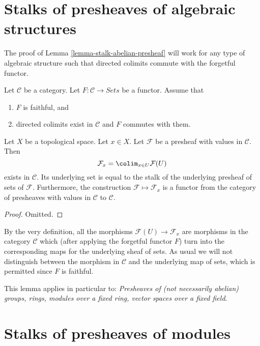 \section{Stalks of presheaves of algebraic structures}
\label{section-stalks-presheaves-structures}

\noindent
The proof of Lemma \ref{lemma-stalk-abelian-presheaf} will work
for any type of algebraic structure such that directed
colimits commute with the forgetful functor.

\begin{lemma}
\label{lemma-stalk-presheaf-values-in-category}
Let $\mathcal{C}$ be a category. Let $F : \mathcal{C} \to \textit{Sets}$
be a functor. Assume that
\begin{enumerate}
\item $F$ is faithful, and
\item directed colimits exist in $\mathcal{C}$ and $F$ commutes with
them.
\end{enumerate}
Let $X$ be a topological space. Let $x \in X$. Let $\mathcal{F}$
be a presheaf with values in $\mathcal{C}$.
Then
$$
\mathcal{F}_x = \colim_{x\in U} \mathcal{F}(U)
$$
exists in $\mathcal{C}$. Its underlying set is equal to the
stalk of the underlying presheaf of sets of $\mathcal{F}$.
Furthermore, the construction $\mathcal{F} \mapsto \mathcal{F}_x$
is a functor from the category of presheaves with values in
$\mathcal{C}$ to $\mathcal{C}$.
\end{lemma}

\begin{proof}
Omitted.
\end{proof}

\noindent
By the very definition, all the morphisms $\mathcal{F}(U)
\to \mathcal{F}_x$ are morphisms in the category $\mathcal{C}$
which (after applying the forgetful functor $F$) turn into
the corresponding maps for the underlying sheaf of sets.
As usual we will not distinguish between the morphism
in $\mathcal{C}$ and the underlying map of sets, which
is permitted since $F$ is faithful.

\medskip\noindent
This lemma applies in particular to:
{\it Presheaves of (not necessarily abelian) groups, rings, modules
over a fixed ring, vector spaces over a fixed field}.

\section{Stalks of presheaves of modules}
\label{section-stalk-presheaves-modules}

